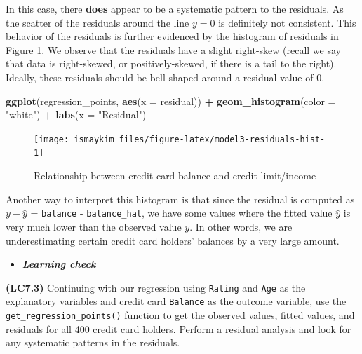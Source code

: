 \documentclass[12pt,]{krantz}
\makeatletter
\newenvironment{Shaded}{\begin{snugshade}}{\end{snugshade}}
\newcommand{\KeywordTok}[1]{\textcolor[rgb]{0.27,0.27,0.27}{\textbf{#1}}}
\newcommand{\DataTypeTok}[1]{\textcolor[rgb]{0.27,0.27,0.27}{#1}}
\newcommand{\StringTok}[1]{\textcolor[rgb]{0.5,0.5,0.5}{#1}}
\newcommand{\OperatorTok}[1]{\textcolor[rgb]{0.43,0.43,0.43}{\textbf{#1}}}
\newcommand{\NormalTok}[1]{#1}
\newenvironment{kframe}{%
\medskip{}
\setlength{\fboxsep}{.8em}
 \def\at@end@of@kframe{}%
 \ifinner\ifhmode%
  \def\at@end@of@kframe{\end{minipage}}%
  \begin{minipage}{\columnwidth}%
 \fi\fi%
 \def\FrameCommand##1{\hskip\@totalleftmargin \hskip-\fboxsep
 \colorbox{shadecolor}{##1}\hskip-\fboxsep
     \hskip-\linewidth \hskip-\@totalleftmargin \hskip\columnwidth}%
 \MakeFramed {\advance\hsize-\width
   \@totalleftmargin\z@ \linewidth\hsize
   \@setminipage}}%
 {\par\unskip\endMakeFramed%
 \at@end@of@kframe}
\renewenvironment{Shaded}{\begin{kframe}}{\end{kframe}}
\newenvironment{rmdblock}[1]
  {\begin{shaded*}
  \begin{itemize}
  \renewcommand{\labelitemi}{
    \raisebox{-.7\height}[0pt][0pt]{
    }
  }
  \item
  }
  {
  \end{itemize}
  \end{shaded*}
  }
\newenvironment{learncheck}
  {\begin{rmdblock}{warning}}
  {\end{rmdblock}}
\theoremstyle{definition}
\theoremstyle{definition}
\theoremstyle{definition}
\theoremstyle{remark}
\makeatother
\begin{document}
In this case, there \textbf{does} appear to be a systematic pattern to
the residuals. As the scatter of the residuals around the line \(y=0\)
is definitely not consistent. This behavior of the residuals is further
evidenced by the histogram of residuals in Figure
\ref{fig:model3-residuals-hist}. We observe that the residuals have a
slight right-skew (recall we say that data is right-skewed, or
positively-skewed, if there is a tail to the right). Ideally, these
residuals should be bell-shaped around a residual value of 0.

\begin{Shaded}
\begin{Highlighting}[]
\KeywordTok{ggplot}\NormalTok{(regression_points, }\KeywordTok{aes}\NormalTok{(}\DataTypeTok{x =}\NormalTok{ residual)) }\OperatorTok{+}
\StringTok{  }\KeywordTok{geom_histogram}\NormalTok{(}\DataTypeTok{color =} \StringTok{"white"}\NormalTok{) }\OperatorTok{+}
\StringTok{  }\KeywordTok{labs}\NormalTok{(}\DataTypeTok{x =} \StringTok{"Residual"}\NormalTok{)}
\end{Highlighting}
\end{Shaded}

\begin{figure}

{\centering \texttt{[image: ismaykim\_files/figure-latex/model3-residuals-hist-1]} 

}

\caption{Relationship between credit card balance and credit limit/income}\label{fig:model3-residuals-hist}
\end{figure}

Another way to interpret this histogram is that since the residual is
computed as \(y - \widehat{y}\) = \texttt{balance} -
\texttt{balance\_hat}, we have some values where the fitted value
\(\widehat{y}\) is very much lower than the observed value \(y\). In
other words, we are underestimating certain credit card holders'
balances by a very large amount.

\begin{learncheck}
\textbf{\emph{Learning check}}
\end{learncheck}

\textbf{(LC7.3)} Continuing with our regression using \texttt{Rating}
and \texttt{Age} as the explanatory variables and credit card
\texttt{Balance} as the outcome variable, use the
\texttt{get\_regression\_points()} function to get the observed values,
fitted values, and residuals for all 400 credit card holders. Perform a
residual analysis and look for any systematic patterns in the residuals.
\end{document}
